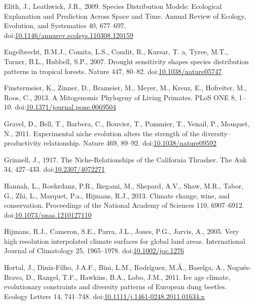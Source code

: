 \hypertarget{ref-Elith2009a}{}
Elith, J., Leathwick, J.R., 2009. Species Distribution Models:
Ecological Explanation and Prediction Across Space and Time. Annual
Review of Ecology, Evolution, and Systematics 40, 677--697.
doi:\href{https://doi.org/10.1146/annurev.ecolsys.110308.120159}{10.1146/annurev.ecolsys.110308.120159}

\hypertarget{ref-Engelbrecht2007}{}
Engelbrecht, B.M.J., Comita, L.S., Condit, R., Kursar, T. a, Tyree,
M.T., Turner, B.L., Hubbell, S.P., 2007. Drought sensitivity shapes
species distribution patterns in tropical forests. Nature 447, 80--82.
doi:\href{https://doi.org/10.1038/nature05747}{10.1038/nature05747}

\hypertarget{ref-Finstermeier2013}{}
Finstermeier, K., Zinner, D., Brameier, M., Meyer, M., Kreuz, E.,
Hofreiter, M., Roos, C., 2013. A Mitogenomic Phylogeny of Living
Primates. PLoS ONE 8, 1--10.
doi:\href{https://doi.org/10.1371/journal.pone.0069504}{10.1371/journal.pone.0069504}

\hypertarget{ref-Gravel2011c}{}
Gravel, D., Bell, T., Barbera, C., Bouvier, T., Pommier, T., Venail, P.,
Mouquet, N., 2011. Experimental niche evolution alters the strength of
the diversity--productivity relationship. Nature 469, 89--92.
doi:\href{https://doi.org/10.1038/nature09592}{10.1038/nature09592}

\hypertarget{ref-Grinnell1917a}{}
Grinnell, J., 1917. The Niche-Relationships of the California Thrasher.
The Auk 34, 427--433.
doi:\href{https://doi.org/10.2307/4072271}{10.2307/4072271}

\hypertarget{ref-Hannah2013}{}
Hannah, L., Roehrdanz, P.R., Ikegami, M., Shepard, A.V., Shaw, M.R.,
Tabor, G., Zhi, L., Marquet, P.a., Hijmans, R.J., 2013. Climate change,
wine, and conservation. Proceedings of the National Academy of Sciences
110, 6907--6912.
doi:\href{https://doi.org/10.1073/pnas.1210127110}{10.1073/pnas.1210127110}

\hypertarget{ref-Hijmans2005}{}
Hijmans, R.J., Cameron, S.E., Parra, J.L., Jones, P.G., Jarvis, A.,
2005. Very high resolution interpolated climate surfaces for global land
areas. International Journal of Climatology 25, 1965--1978.
doi:\href{https://doi.org/10.1002/joc.1276}{10.1002/joc.1276}

\hypertarget{ref-Hortal2011}{}
Hortal, J., Diniz-Filho, J.A.F., Bini, L.M., Rodríguez, M.Á., Baselga,
A., Nogués-Bravo, D., Rangel, T.F., Hawkins, B.A., Lobo, J.M., 2011. Ice
age climate, evolutionary constraints and diversity patterns of European
dung beetles. Ecology Letters 14, 741--748.
doi:\href{https://doi.org/10.1111/j.1461-0248.2011.01634.x}{10.1111/j.1461-0248.2011.01634.x}

